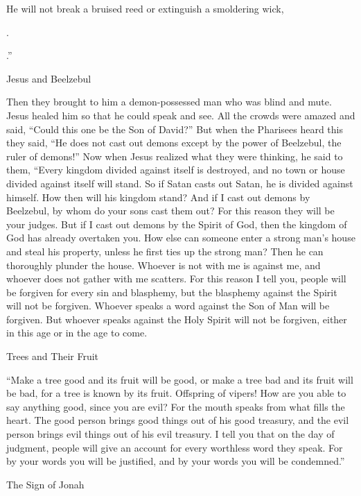 {{{He will
not
break
a
bruised
reed
or extinguish
a smoldering wick,}}
\par }{.
\par }{\Q {}.”
\par }{\SH Jesus and Beelzebul
\par }{\PP {}Then
they brought
to him
a demon-possessed man
who was blind
and
mute.
Jesus healed
him
so that
he could speak
and
see.
All
the crowds
were amazed
and
said,
“Could
this one
be
the Son
of David?”
But
when the Pharisees
heard
this they said,
“He
does
not
cast out
demons
except
by
the power of Beelzebul,
the ruler
of demons!”
Now when Jesus realized
what they
were thinking,
he said
to them, “Every
kingdom
divided
against
itself
is destroyed,
and
no
town
or
house
divided
against
itself
will stand.
So
if
Satan
casts out
Satan,
he is divided
against
himself.
How
then
will
his
kingdom
stand?
And
if
I
cast out
demons
by
Beelzebul,
by
whom
do your
sons
cast
them
out? For
this
reason they will be
your
judges.
But
if
I
cast out
demons
by
the Spirit
of God,
then
the kingdom
of God
has already overtaken
you.
How
else
can
someone
enter
a strong man’s
house
and
steal
his
property,
unless
he
first
ties up
the strong man? Then
he can thoroughly plunder
the house.
Whoever is
not
with
me
is
against
me,
and
whoever does
not
gather
with
me
scatters.
For
this
reason I tell
you,
people
will be forgiven
for every
sin
and
blasphemy,
but the
blasphemy
against the Spirit
will
not
be forgiven.
Whoever
speaks
a word
against
the Son
of Man
will be forgiven.
But
whoever
speaks
against
the Holy
Spirit
will
not
be forgiven,
either
in
this
age
or
in
the age to come.
\par }{\SH Trees and Their Fruit
\par }{\PP {}“Make
a tree
good
and
its
fruit
will be good,
or
make
a tree
bad
and
its
fruit
will be bad,
for
a tree
is known
by
its fruit.
Offspring
of vipers! How
are you able
to say
anything good,
since you are
evil? For
the mouth
speaks
from
what fills
the heart.
The good
person
brings
good things
out
of his good
treasury,
and
the evil
person
brings
evil things
out
of his evil
treasury.
I tell
you
that
on
the day
of judgment,
people
will give
an account
for
every
worthless
word
they speak.
For
by
your
words
you will be justified,
and
by
your
words
you will be condemned.”
\par }{\SH The Sign of Jonah
}
